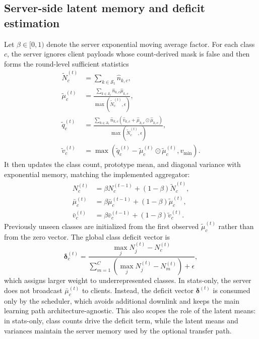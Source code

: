 \documentclass[10pt,journal]{IEEEtran}
\newcommand{\statsonly}{stats-only}
\newcommand{\deficit}{\boldsymbol{\delta}}
\begin{document}
\subsection{Server-side latent memory and deficit estimation}
Let $\beta\in[0,1)$ denote the server exponential moving average factor. For each class $c$, the server ignores client payloads whose count-derived mask is false and then forms the round-level sufficient statistics
\begin{align}
\widetilde{N}_c^{(t)} &=
\sum_{k\in\mathcal{S}_t}\widehat{n}_{k,c}, \\
\widetilde{\mu}_c^{(t)} &=
\frac{\sum_{k\in\mathcal{S}_t}\widehat{n}_{k,c}\widehat{\mu}_{k,c}}
{\max\!\left(\widetilde{N}_c^{(t)},\epsilon\right)},\\
\widetilde{q}_c^{(t)} &=
\frac{\sum_{k\in\mathcal{S}_t}\widehat{n}_{k,c}
\left(\widehat{v}_{k,c}+\widehat{\mu}_{k,c}\odot\widehat{\mu}_{k,c}\right)}
{\max\!\left(\widetilde{N}_c^{(t)},\epsilon\right)},\\
\widetilde{v}_c^{(t)} &= \max\!\left(\widetilde{q}_c^{(t)}
-\widetilde{\mu}_c^{(t)}\odot\widetilde{\mu}_c^{(t)}, v_{\min}\right).
\end{align}
It then updates the class count, prototype mean, and diagonal variance with exponential memory, matching the implemented aggregator:
\begin{align}
N_c^{(t)} &= \beta N_c^{(t-1)}
+ (1-\beta)\widetilde{N}_c^{(t)}, \\
\bar{\mu}_c^{(t)} &= \beta\bar{\mu}_c^{(t-1)}
+ (1-\beta)\widetilde{\mu}_c^{(t)},\\
\bar{v}_c^{(t)} &= \beta\bar{v}_c^{(t-1)}
+ (1-\beta)\widetilde{v}_c^{(t)}.
\end{align}
Previously unseen classes are initialized from the first observed $\widetilde{\mu}_c^{(t)}$ rather than from the zero vector.
The global class deficit vector is
\begin{equation}
\deficit_c^{(t)} =
\frac{\max_j N_j^{(t)} - N_c^{(t)}}
{\sum_{m=1}^{C}\left(\max_j N_j^{(t)} - N_m^{(t)}\right)+\epsilon},
\label{eq:deficit}
\end{equation}
which assigns larger weight to underrepresented classes. In \statsonly{}, the server does not broadcast $\bar{\mu}_c^{(t)}$ to clients. Instead, the deficit vector $\deficit^{(t)}$ is consumed only by the scheduler, which avoids additional downlink and keeps the main learning path architecture-agnostic. This also scopes the role of the latent means: in \statsonly{}, class counts drive the deficit term, while the latent means and variances maintain the server memory used by the optional transfer path.
\end{document}
